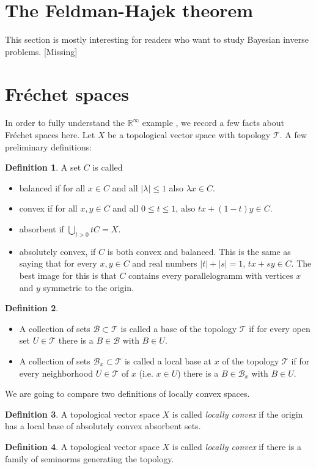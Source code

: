 \documentclass{scrartcl}
\theoremstyle{definition}
\newtheorem{definition}{Definition}
\theoremstyle{remark}
\newcommand{\Frechet}{Fr\'echet }
\newcommand{\T}{\mathcal T}
\newcommand{\R}{\mathbb R}
\newcommand{\ednote}[1]{{\color{red}[#1]}}
\newcommand*\circled[1]{\tikz[baseline=(char.base)]{
            \node[shape=circle,draw,inner sep=2pt] (char) {#1};}}
\begin{document}
\section{The Feldman-Hajek theorem}
This section is mostly interesting for readers who want to study Bayesian inverse problems. \ednote{Missing}
\appendix
\section{\Frechet spaces}
In order to fully understand the $\R^\infty$ example \circled{2}, we record a few facts about \Frechet spaces here. Let $X$ be a topological vector space with topology $\T$. A few preliminary definitions:
\begin{definition}
A set $C$ is called
\begin{itemize}
\item balanced if for all $x\in C$ and all $|\lambda| \leq 1$ also $\lambda x \in C$.
\item convex if for all $x, y\in C$ and all $0\leq t \leq 1$, also $tx+(1-t)y\in C$.
\item absorbent if $\bigcup_{t>0} tC = X$.
\item absolutely convex, if $C$ is both convex and balanced. This is the same as saying that for every $x,y\in C$ and real numbers $|t|+|s|=1$, $tx+sy \in C$. The best image for this is that $C$ contains every parallelogramm with vertices $x$ and $y$ symmetric to the origin.
\end{itemize} 
\end{definition}
\begin{definition}
\begin{itemize}
\item A collection of sets $\mathcal B \subset \T$ is called a base of the topology $\T$ if for every open set $U\in\T$ there is a $B\in \mathcal B$ with $B\in U$.
\item A collection of sets $\mathcal B_x \subset \T$ is called a local base at $x$ of the topology $\T$ if for every neighborhood $U\in\T$ of $x$ (i.e. $x\in U$) there is a $B\in \mathcal{ B}_x$ with $B\in U$.
\end{itemize}
\end{definition}

We are going to compare two definitions of locally convex spaces.

\begin{minipage}[t]{0.45\textwidth}
\begin{definition}\label{def:l1}
A topological vector space $X$ is called \textit{locally convex} if the origin has a local base of absolutely convex absorbent sets.
\end{definition}
\end{minipage}
\hfill
\begin{minipage}[t]{0.45\textwidth}
\begin{definition}\label{def:l2}
A topological vector space $X$ is called \textit{locally convex} if there is a family of seminorms generating the topology.
\end{definition}
\end{minipage}
\end{document}
